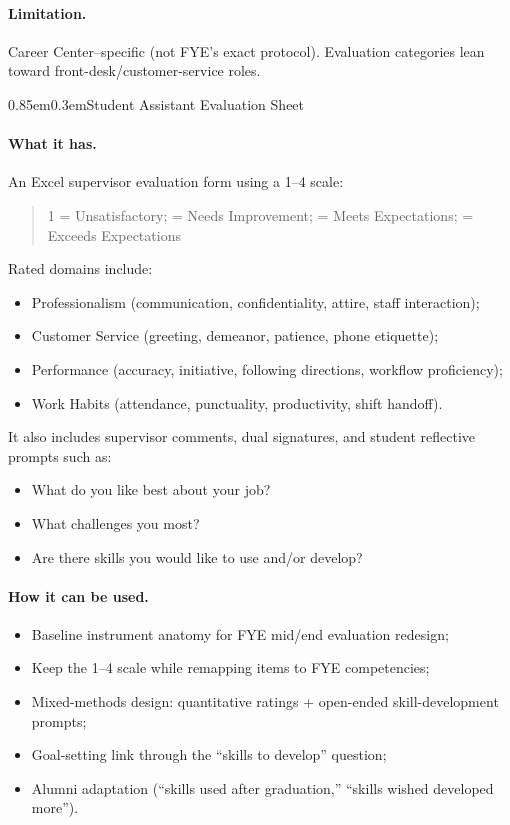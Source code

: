 \documentclass[11pt,letterpaper]{article}
\makeatletter
\renewcommand\subsection{\@startsection{subsection}{2}{\z@}%
  {0.85em}{0.3em}{\normalsize\bfseries}}
\makeatother
\begin{document}
\paragraph{Limitation.}
Career Center--specific (not FYE's exact protocol). Evaluation categories lean toward front-desk/customer-service roles.

\subsection{Student Assistant Evaluation Sheet}
\paragraph{What it has.}
An Excel supervisor evaluation form using a 1--4 scale:
\begin{quote}
1 = Unsatisfactory; = Needs Improvement; = Meets Expectations; = Exceeds Expectations
\end{quote}
Rated domains include:
\begin{itemize}
  \item Professionalism (communication, confidentiality, attire, staff interaction);
  \item Customer Service (greeting, demeanor, patience, phone etiquette);
  \item Performance (accuracy, initiative, following directions, workflow proficiency);
  \item Work Habits (attendance, punctuality, productivity, shift handoff).
\end{itemize}
It also includes supervisor comments, dual signatures, and student reflective prompts such as:
\begin{itemize}
  \item What do you like best about your job?
  \item What challenges you most?
  \item Are there skills you would like to use and/or develop?
\end{itemize}

\paragraph{How it can be used.}
\begin{itemize}
  \item Baseline instrument anatomy for FYE mid/end evaluation redesign;
  \item Keep the 1--4 scale while remapping items to FYE competencies;
  \item Mixed-methods design: quantitative ratings + open-ended skill-development prompts;
  \item Goal-setting link through the ``skills to develop'' question;
  \item Alumni adaptation (``skills used after graduation,'' ``skills wished developed more'').
\end{itemize}
\end{document}
